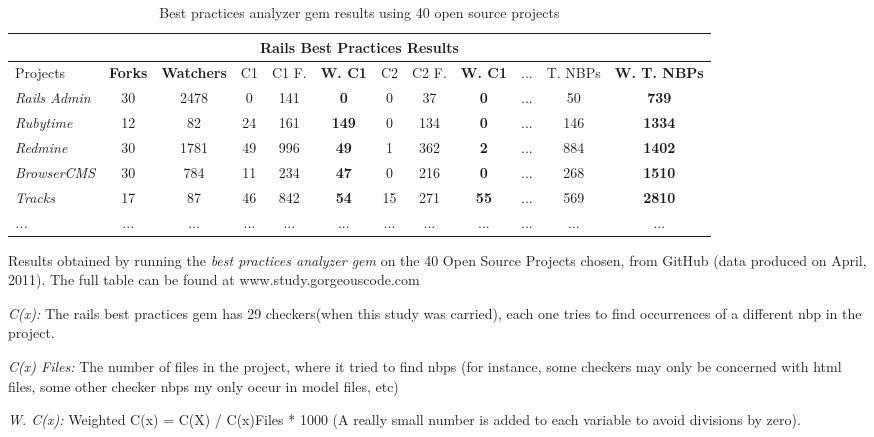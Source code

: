 \begin{table}[H]
\begin{center}
{\scriptsize
\begin{threeparttable}
\begin{tabular}{|l||c|c|c|c|c|c|c|c|c|c|c|} \hline
\multicolumn{12}{|c|}{Rails Best Practices Results} \\ \hline
Projects & \textbf{Forks}         & \textbf{Watchers} & 
C1       & C1 F.                  & \textbf{W. C1} & 
C2       & C2 F.                  & \textbf{W.       C1} & 
...      & T. NBPs                & \textbf{W.  T. NBPs} \\\hline\hline
\emph{Rails Admin } & 30 & 2478 &  0 & 141 & \textbf{  0 }&  0 &  37 & \textbf{ 0} & ...&  50 & \textbf{ 739}  \\ \hline
\emph{Rubytime    } & 12 &   82 & 24 & 161 & \textbf{149 }&  0 & 134 & \textbf{ 0} & ...& 146 & \textbf{1334}  \\ \hline
\emph{Redmine     } & 30 & 1781 & 49 & 996 & \textbf{ 49 }&  1 & 362 & \textbf{ 2} & ...& 884 & \textbf{1402}  \\ \hline
\emph{BrowserCMS  } & 30 &  784 & 11 & 234 & \textbf{ 47 }&  0 & 216 & \textbf{ 0} & ...& 268 & \textbf{1510}  \\ \hline
\emph{Tracks      } & 17 &   87 & 46 & 842 & \textbf{ 54 }& 15 & 271 & \textbf{55} & ...& 569 & \textbf{2810}  \\ \hline
\emph{...}&...&...&...&...&...&...&...&...&...&...&...\\ \hline
\end{tabular} 

\begin{tablenotes}
  \item Results obtained by running the \emph{best practices analyzer gem} on the 40 Open Source Projects chosen, 
        from GitHub (data produced on April, 2011). The full table can be found at www.study.gorgeouscode.com
  \item{ \emph{C(x): }} The rails best practices gem has 29 checkers(when this study was carried), 
                        each one tries to find occurrences of a different nbp in the project. 
  \item{\emph{C(x) Files: }} The number of files in the project, where it tried to find nbps 
                             (for instance, some checkers may only be concerned with html files, 
                             some other checker nbps my only occur in model files, etc)
  \item{\emph{W. C(x): }} Weighted C(x) = C(X) / C(x)Files * 1000 
                          (A really small number is added to each variable to avoid divisions by zero).
\end{tablenotes}
\end{threeparttable}
}
\end{center}
\caption{Best practices analyzer gem results using 40 open source projects}
\label{tab:rbpresults_2_raw}
\end{table}